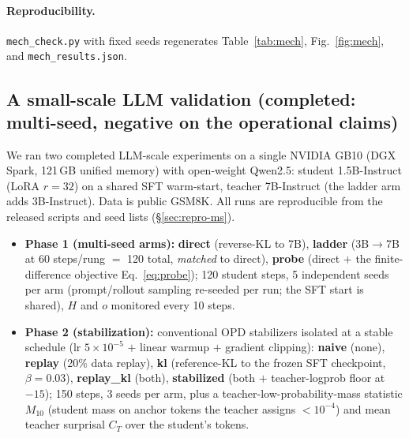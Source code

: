 \documentclass[11pt]{article}
\begin{document}
\paragraph{Reproducibility.} \texttt{mech\_check.py} with fixed seeds regenerates Table~\ref{tab:mech}, Fig.~\ref{fig:mech}, and \texttt{mech\_results.json}.

\subsection{A small-scale LLM validation (completed: multi-seed, negative on the operational claims)}
\label{sec:smallscale}
We ran two completed LLM-scale experiments on a single NVIDIA GB10 (DGX Spark, 121\,GB unified memory) with open-weight Qwen2.5: student 1.5B-Instruct (LoRA $r{=}32$) on a shared SFT warm-start, teacher 7B-Instruct (the ladder arm adds 3B-Instruct). Data is public GSM8K. All runs are reproducible from the released scripts and seed lists (\S\ref{sec:repro-ms}).
\begin{itemize}
  \item \textbf{Phase 1 (multi-seed arms):} \textbf{direct} (reverse-KL to 7B), \textbf{ladder} (3B$\to$7B at 60 steps/rung $=$ 120 total, \emph{matched} to direct), \textbf{probe} (direct $+$ the finite-difference objective Eq.~\eqref{eq:probe}); 120 student steps, 5 independent seeds per arm (prompt/rollout sampling re-seeded per run; the SFT start is shared), $H$ and $o$ monitored every 10 steps.
  \item \textbf{Phase 2 (stabilization):} conventional OPD stabilizers isolated at a stable schedule (lr $5\!\times\!10^{-5}$ $+$ linear warmup $+$ gradient clipping): \textbf{naive} (none), \textbf{replay} (20\% data replay), \textbf{kl} (reference-KL to the frozen SFT checkpoint, $\beta{=}0.03$), \textbf{replay\_kl} (both), \textbf{stabilized} (both $+$ teacher-logprob floor at $-15$); 150 steps, 3 seeds per arm, plus a teacher-low-probability-mass statistic $M_{10}$ (student mass on anchor tokens the teacher assigns $<10^{-4}$) and mean teacher surprisal $C_T$ over the student's tokens.
\end{itemize}
\end{document}

